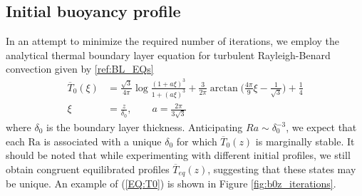 \documentclass[twocolumn,showpacs,amsmath,amssymb]{revtex4}
\newcommand{\Ra}{\mbox{Ra}}
\def\bar{\overline}
\begin{document}
\subsection{Initial buoyancy profile} \label{sec:initial_profile}
In an attempt to minimize the required number of iterations, we employ the analytical thermal boundary layer equation for turbulent Rayleigh-Benard convection given by \ref{ref:BL_EQs}
\begin{align}
    \bar{T}_0(\xi) &= \frac{\sqrt{3}}{4\pi} \log \frac{(1 + a\xi)^3}{1 + (a\xi)^3} + \frac{3}{2\pi} \arctan \Big( \frac{4\pi}{9}\xi - \frac{1}{\sqrt{3}} \Big) + \frac{1}{4} \nonumber \\
    \xi &= \frac{z}{\delta_0}, \qquad a = \frac{2\pi}{3\sqrt{3}}\label{EQ:T0}
\end{align}
where $\delta_0$ is the boundary layer thickness. Anticipating $Ra \sim \delta^{-3}_0$, we expect that each $\Ra$ is associated with a unique $\delta_0$ for which $\bar{T}_0(z)$ is marginally stable. It should be noted that while experimenting with different initial profiles, we still obtain congruent equilibrated profiles $\bar{T}_{eq}(z)$, suggesting that these states may be unique. An example of (\ref{EQ:T0}) is shown in Figure \ref{fig:b0z_iterations}.

\end{document}
